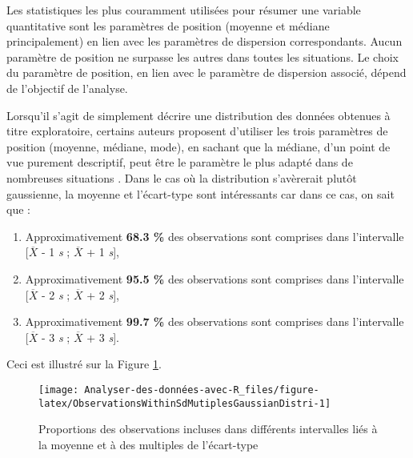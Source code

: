 \documentclass[
  french,
]{book}
\providecommand{\tightlist}{%
  \setlength{\itemsep}{0pt}\setlength{\parskip}{0pt}}
\begin{document}
Les statistiques les plus couramment utilisées pour résumer une variable quantitative sont les paramètres de position (moyenne et médiane principalement) en lien avec les paramètres de dispersion correspondants. Aucun paramètre de position ne surpasse les autres dans toutes les situations. Le choix du paramètre de position, en lien avec le paramètre de dispersion associé, dépend de l'objectif de l'analyse.

Lorsqu'il s'agit de simplement décrire une distribution des données obtenues à titre exploratoire, certains auteurs proposent d'utiliser les trois paramètres de position (moyenne, médiane, mode), en sachant que la médiane, d'un point de vue purement descriptif, peut être le paramètre le plus adapté dans de nombreuses situations \autocite{gonzalesMeasuresCentralTendency2001}. Dans le cas où la distribution s'avèrerait plutôt gaussienne, la moyenne et l'écart-type sont intéressants car dans ce cas, on sait que :

\begin{enumerate}
\def\labelenumi{\arabic{enumi}.}
\tightlist
\item
  Approximativement \textbf{68.3 \%} des observations sont comprises dans l'intervalle {[}\(\overline{X}\) - 1 \emph{s} ; \(\overline{X}\) + 1 \emph{s}{]},
\item
  Approximativement \textbf{95.5 \%} des observations sont comprises dans l'intervalle {[}\(\overline{X}\) - 2 \emph{s} ; \(\overline{X}\) + 2 \emph{s}{]},
\item
  Approximativement \textbf{99.7 \%} des observations sont comprises dans l'intervalle {[}\(\overline{X}\) - 3 \emph{s} ; \(\overline{X}\) + 3 \emph{s}{]}.
\end{enumerate}

Ceci est illustré sur la Figure \ref{fig:ObservationsWithinSdMutiplesGaussianDistri}.

\begin{figure}

{\centering \texttt{[image: Analyser-des-données-avec-R\_files/figure-latex/ObservationsWithinSdMutiplesGaussianDistri-1]} 

}

\caption{Proportions des observations incluses dans différents intervalles liés à la moyenne et à des multiples de l'écart-type}\label{fig:ObservationsWithinSdMutiplesGaussianDistri}
\end{figure}
\end{document}
